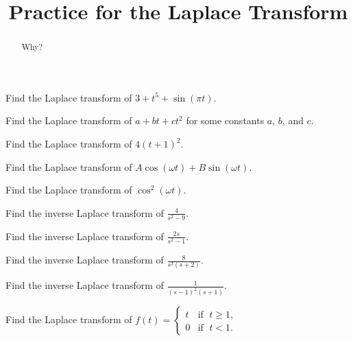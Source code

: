 \documentclass{ximera}
\title{Practice for the Laplace Transform}
\begin{document}
\begin{abstract}
Why?
\end{abstract}
\maketitle


\begin{exercise}
    Find the Laplace transform of $3+t^5+\sin (\pi t)$.
\end{exercise}

\begin{exercise}
    Find the Laplace transform of $a+bt+ct^2$ for some constants $a$, $b$, and $c$.
\end{exercise}

\begin{exercise}
    Find the Laplace transform of $4{(t+1)}^2$.
\end{exercise}

\begin{exercise}
    Find the Laplace transform of $A \cos (\omega t) + B \sin (\omega t)$.
\end{exercise}

\begin{exercise}
    Find the Laplace transform of $\cos^2 (\omega t)$.
\end{exercise}

\begin{exercise}
    Find the inverse Laplace transform of $\frac{4}{s^2-9}$.
\end{exercise}

\begin{exercise}
    Find the inverse Laplace transform of $\frac{2s}{s^2-1}$.
\end{exercise}

\begin{exercise}%
    Find the inverse Laplace transform of $\frac{8}{s^3(s+2)}$.
\end{exercise}

\begin{exercise}
    Find the inverse Laplace transform of $\frac{1}{{(s-1)}^2(s+1)}$.
\end{exercise}

\begin{exercise}
    Find the Laplace transform of $f(t) =
    \begin{cases}
        t & \text{if } \; t \geq 1, \\
        0 & \text{if } \; t < 1.
    \end{cases}$
\end{exercise}
\end{document}
